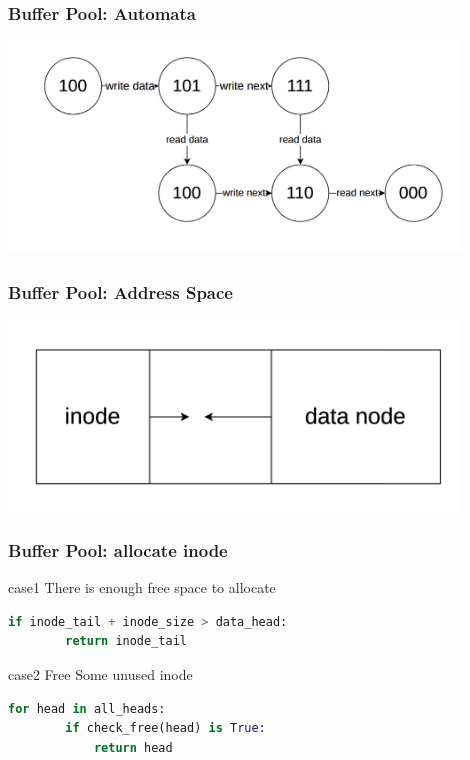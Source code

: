 \documentclass[notheorems, aspectratio=54]{beamer}
\begin{document}
\begin{frame}
    \frametitle{Buffer Pool: Automata}
    \centering
    \includegraphics[width=12cm]{global_img_dir/automata.png}
\end{frame}

\begin{frame}
    \frametitle{Buffer Pool: Address Space}
    \centering
    \includegraphics[width=12cm]{global_img_dir/space.png}
\end{frame}

\begin{frame}[fragile]
    \frametitle{Buffer Pool: allocate inode}
    
        \begin{block} {case1}
            There is enough free space to allocate
        \end{block}
        \begin{lstlisting}[language=python]
    if inode_tail + inode_size > data_head:
        return inode_tail
        \end{lstlisting}

        \begin{block} {case2}
            Free Some unused inode
        \end{block}
        \begin{lstlisting}[language=python]
    for head in all_heads:
        if check_free(head) is True:
            return head
        \end{lstlisting}
        
\end{frame}
\end{document}
